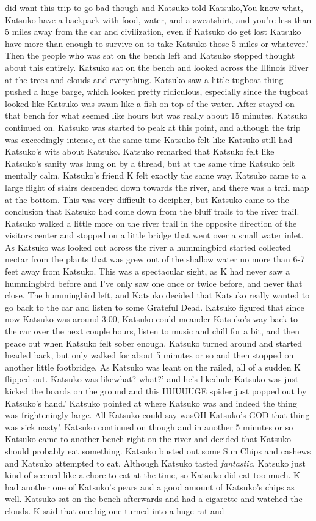 \documentclass[12pt]{book}
\begin{document}
did want this trip to go bad though and Katsuko told Katsuko,You know what, Katsuko have a backpack with food, water, and a sweatshirt, and you're less than 5 miles away from the car and civilization, even if Katsuko do get lost Katsuko have more than enough to survive on to take Katsuko those 5 miles or whatever.' Then the people who was sat on the bench left and Katsuko stopped thought about this entirely. Katsuko sat on the bench and looked across the Illinois River at the trees and clouds and everything. Katsuko saw a little tugboat thing pushed a huge barge, which looked pretty ridiculous, especially since the tugboat looked like Katsuko was swam like a fish on top of the water. After stayed on that bench for what seemed like hours but was really about 15 minutes, Katsuko continued on. Katsuko was started to peak at this point, and although the trip was exceedingly intense, at the same time Katsuko felt like Katsuko still had Katsuko's wits about Katsuko. Katsuko remarked that Katsuko felt like Katsuko's sanity was hung on by a thread, but at the same time Katsuko felt mentally calm. Katsuko's friend K felt exactly the same way. Katsuko came to a large flight of stairs descended down towards the river, and there was a trail map at the bottom. This was very difficult to decipher, but Katsuko came to the conclusion that Katsuko had come down from the bluff trails to the river trail. Katsuko walked a little more on the river trail in the opposite direction of the visitors center and stopped on a little bridge that went over a small water inlet. As Katsuko was looked out across the river a hummingbird started collected nectar from the plants that was grew out of the shallow water no more than 6-7 feet away from Katsuko. This was a spectacular sight, as K had never saw a hummingbird before and I've only saw one once or twice before, and never that close. The hummingbird left, and Katsuko decided that Katsuko really wanted to go back to the car and listen to some Grateful Dead. Katsuko figured that since now Katsuko was around 3:00, Katsuko could meander Katsuko's way back to the car over the next couple hours, listen to music and chill for a bit, and then peace out when Katsuko felt sober enough. Katsuko turned around and started headed back, but only walked for about 5 minutes or so and then stopped on another little footbridge. As Katsuko was leant on the railed, all of a sudden K flipped out. Katsuko was likewhat? what?' and he's likedude Katsuko was just kicked the boards on the ground and this HUUUUGE spider just popped out by Katsuko's hand.' Katsuko pointed at where Katsuko was and indeed the thing was frighteningly large. All Katsuko could say wasOH Katsuko's GOD that thing was sick nasty'. Katsuko continued on though and in another 5 minutes or so Katsuko came to another bench right on the river and decided that Katsuko should probably eat something. Katsuko busted out some Sun Chips and cashews and Katsuko attempted to eat. Although Katsuko tasted \emph{fantastic}, Katsuko just kind of seemed like a chore to eat at the time, so Katsuko did eat too much. K had another one of Katsuko's pears and a good amount of Katsuko's chips as well. Katsuko sat on the bench afterwards and had a cigarette and watched the clouds. K said that one big one turned into a huge rat and 
\end{document}
